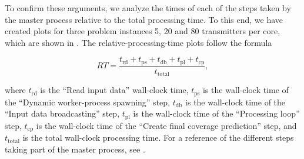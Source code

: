 To confirm these arguments, we analyze the times of each of the steps
taken by the master process relative to the total processing time.
To this end, we have created plots for three problem instances 5,
20 and 80 transmitters per core, which are shown in .
The relative-processing-time plots follow the formula

\begin{equation}
RT=\frac{t_{\textrm{rd}}+t_{\textrm{ps}}+t_{\textrm{db}}+t_{\textrm{pl}}+t_{\textrm{cp}}}{t_{\textrm{total}}},\label{eq:relative_processing_time}
\end{equation}


\noindent where $t_{\textrm{rd}}$ is the ``Read input data'' wall-clock
time, $t_{\textrm{ps}}$ is the wall-clock time of the ``Dynamic
worker-process spawning'' step, $t_{\textrm{db}}$ is the wall-clock
time of the ``Input data broadcasting'' step, $t_{\textrm{pl}}$
is the wall-clock time of the ``Processing loop'' step, $t_{\textrm{cp}}$
is the wall-clock time of the ``Create final coverage prediction''
step, and $t_{\textrm{total}}$ is the total wall-clock processing
time. For a reference of the different steps taking part of the master
process, see .

